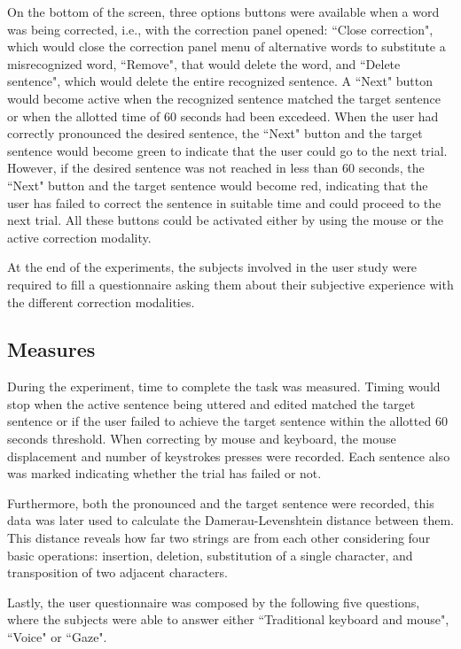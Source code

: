 \documentclass[]{article}
\begin{document}
On the bottom of the screen, three options buttons were available when a word was being corrected, i.e., with the
correction panel opened: ``Close correction", which would close the correction panel menu of alternative words to
substitute a misrecognized word, ``Remove", that would delete the word, and ``Delete sentence", which would delete the
entire recognized sentence. A ``Next" button would become active when the recognized sentence matched the target
sentence or when the allotted time of 60 seconds had been excedeed. When the user had correctly pronounced the desired
sentence, the ``Next" button and the target sentence would become green to indicate that the user could go to the next
trial. However, if the desired sentence was not reached in less than 60 seconds, the ``Next" button and the target
sentence would become red, indicating that the user has failed to correct the sentence in suitable time and could
proceed to the next trial. All these buttons could be activated either by using the mouse or the active correction
modality.

At the end of the experiments, the subjects involved in the user study were required to fill a questionnaire asking them
about their subjective experience with the different correction modalities.


\subsection{Measures}
During the experiment, time to complete the task was measured.  Timing would stop when the active sentence being uttered
and edited matched the target sentence or if the user failed to achieve the target sentence within the allotted 60
seconds threshold. When correcting by mouse and keyboard, the mouse displacement and number of keystrokes presses were
recorded. Each sentence also was marked indicating whether the trial has failed or not.


Furthermore, both the pronounced and the target sentence were recorded, this data was later used to calculate the Damerau-Levenshtein
distance \cite{Damerau1964} between them. This distance reveals how far two strings are from each other considering four
basic operations: insertion, deletion, substitution of a single character, and transposition of two adjacent characters.

Lastly, the user questionnaire was composed by the following five questions, where the subjects were able to answer
either ``Traditional keyboard and mouse", ``Voice" or ``Gaze".
\end{document}

